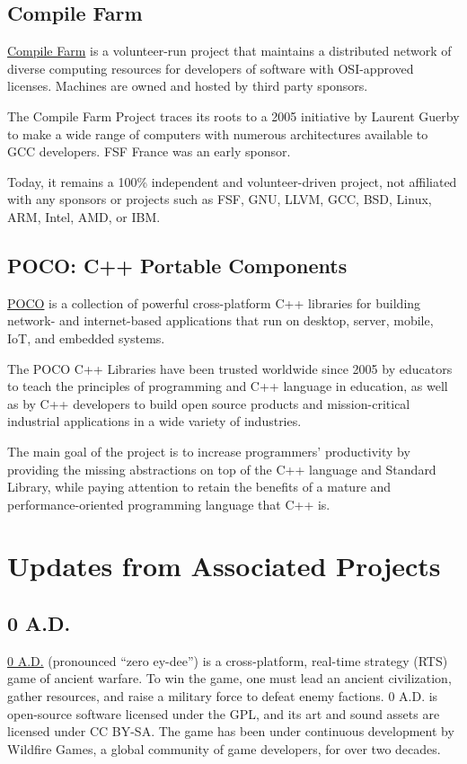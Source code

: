\documentclass[a4paper]{report}
\begin{document}
\subsection{Compile Farm}

\href{https://cfarm.tetaneutral.net/}{Compile Farm} is a volunteer-run project that maintains a distributed network of diverse computing resources for developers of software with OSI-approved licenses. Machines are owned and hosted by third party sponsors.

The Compile Farm Project traces its roots to a 2005 initiative by Laurent Guerby to make a wide range of computers with numerous architectures available to GCC developers. FSF France was an early sponsor.

Today, it remains a 100\% independent and volunteer-driven project, not affiliated with any sponsors or projects such as FSF, GNU, LLVM, GCC, BSD, Linux, ARM, Intel, AMD, or IBM.

\subsection{POCO: C++ Portable Components}

\href{https://pocoproject.org/}{POCO} is a collection of powerful cross-platform C++ libraries for building network- and internet-based applications that run on desktop, server, mobile, IoT, and embedded systems.

The POCO C++ Libraries have been trusted worldwide since 2005 by educators to teach the principles of programming and C++ language in education, as well as by C++ developers to build open source products and mission-critical industrial applications in a wide variety of industries.

The main goal of the project is to increase programmers' productivity by providing the missing abstractions on top of the C++ language and Standard Library, while paying attention to retain the benefits of a mature and performance-oriented programming language that C++ is.

\section{Updates from Associated Projects}

\subsection{0 A.D.}

\href{https://play0ad.com/}{0 A.D.} (pronounced ``zero ey-dee'') is a cross-platform, real-time strategy (RTS) game of ancient warfare. To win the game, one must lead an ancient civilization, gather resources, and raise a military force to defeat enemy factions. 0 A.D. is open-source software licensed under the GPL, and its art and sound assets are licensed under CC BY-SA. The game has been under continuous development by Wildfire Games, a global community of game developers, for over two decades.
\end{document}
